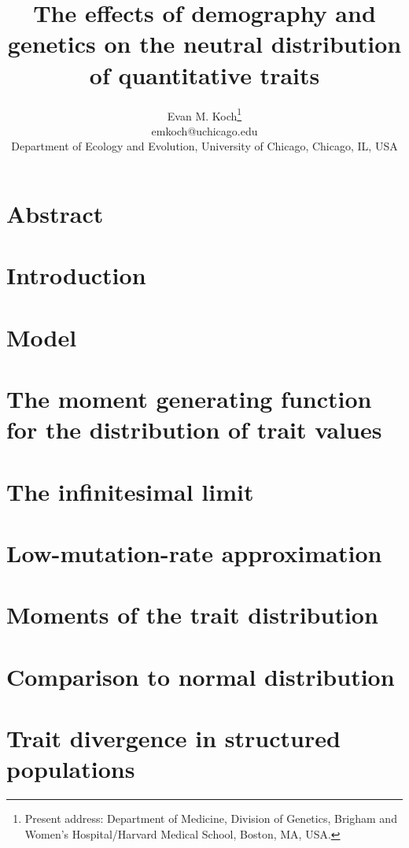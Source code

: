 \documentclass{article}
\begin{document}
\title{The effects of demography and genetics on the neutral distribution of
  quantitative traits} \author{Evan M. Koch\footnote{Present address: Department
    of Medicine, Division of Genetics, Brigham and Women’s Hospital/Harvard
    Medical School, Boston, MA, USA.} \\ emkoch@uchicago.edu \\ Department of
  Ecology and Evolution, University of Chicago, Chicago, IL, USA}
\date{}
\maketitle



\section{Abstract}

\section{Introduction}

\section{Model}

\section{The moment generating function for the distribution of trait values}

\section{The infinitesimal limit}

\section{Low-mutation-rate approximation} \label{sec:lmr}

\section{Moments of the trait distribution}

\section{Comparison to normal distribution}

\section{Trait divergence in structured populations}

\end{document}
